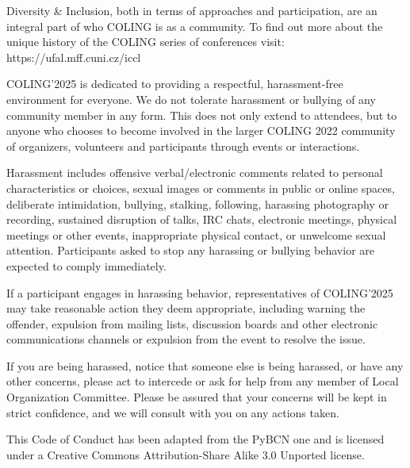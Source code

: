 Diversity \& Inclusion, both in terms of approaches and participation, are an integral part of who COLING is as a community. To find out more about the unique history of the COLING series of conferences visit: https://ufal.mff.cuni.cz/iccl

COLING’2025 is dedicated to providing a respectful, harassment-free environment for everyone. We do not tolerate harassment or bullying of any community member in any form. This does not only extend to attendees, but to anyone who chooses to become involved in the larger COLING 2022 community of organizers, volunteers and participants through events or interactions.

Harassment includes offensive verbal/electronic comments related to personal characteristics or choices, sexual images or comments in public or online spaces, deliberate intimidation, bullying, stalking, following, harassing photography or recording, sustained disruption of talks, IRC chats, electronic meetings, physical meetings or other events, inappropriate physical contact, or unwelcome sexual attention. Participants asked to stop any harassing or bullying behavior are expected to comply immediately.

If a participant engages in harassing behavior, representatives of COLING’2025 may take reasonable action they deem appropriate, including warning the offender, expulsion from mailing lists, discussion boards and other electronic communications channels or expulsion from the event to resolve the issue.

If you are being harassed, notice that someone else is being harassed, or have any other concerns, please act to intercede or ask for help from any member of Local Organization Committee. Please be assured that your concerns will be kept in strict confidence, and we will consult with you on any actions taken.

This Code of Conduct has been adapted from the PyBCN one and is licensed under a Creative Commons Attribution-Share Alike 3.0 Unported license.